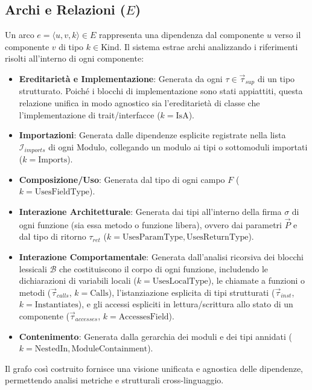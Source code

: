 \subsection{Archi e Relazioni ($E$)}
Un arco $e = \langle u, v, k \rangle \in E$ rappresenta una
dipendenza dal componente $u$ verso il componente $v$ di tipo $k \in
\text{Kind}$. Il sistema estrae archi analizzando i riferimenti
risolti all'interno di ogni componente:
\begin{itemize}
  \item \textbf{Ereditarietà e Implementazione}: Generata da ogni
    $\tau \in \vec{\tau}_{sup}$ di un tipo strutturato. Poiché i
    blocchi di implementazione sono stati appiattiti, questa
    relazione unifica in modo agnostico sia l'ereditarietà di classe
    che l'implementazione di trait/interfacce ($k = \text{IsA}$).
  \item \textbf{Importazioni}: Generata dalle dipendenze esplicite
    registrate nella lista $\mathcal{I}_{imports}$ di ogni Modulo,
    collegando un modulo ai tipi o sottomoduli importati ($k = \text{Imports}$).
  \item \textbf{Composizione/Uso}: Generata dal tipo di ogni campo
    $F$ ($k = \text{UsesFieldType}$).
  \item \textbf{Interazione Architetturale}: Generata dai tipi
    all'interno della firma $\sigma$ di ogni funzione (sia essa
    metodo o funzione libera), ovvero dai parametri $\vec{P}$ e dal
    tipo di ritorno $\tau_{ret}$ ($k = \text{UsesParamType},
    \text{UsesReturnType}$).
  \item \textbf{Interazione Comportamentale}: Generata dall'analisi ricorsiva
    dei blocchi lessicali $\mathcal{B}$ che costituiscono il corpo
    di ogni funzione, includendo le dichiarazioni di variabili locali
    ($k = \text{UsesLocalType}$),
    le chiamate a funzioni o metodi
    ($\vec{\tau}_{calls}$, $k = \text{Calls}$), l'istanziazione
    esplicita di tipi strutturati ($\vec{\tau}_{inst}$, $k =
    \text{Instantiates}$),
    e gli accessi espliciti in lettura/scrittura allo stato di un
    componente ($\vec{\tau}_{accesses}$, $k = \text{AccessesField}$).
  \item \textbf{Contenimento}: Generata dalla gerarchia dei moduli e
    dei tipi annidati ($k = \text{NestedIn}, \text{ModuleContainment}$).
\end{itemize}
Il grafo così costruito fornisce una visione unificata e agnostica
delle dipendenze, permettendo analisi metriche e strutturali cross-linguaggio.

